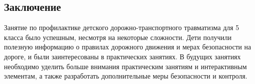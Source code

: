 \documentclass[a4paper,12pt]{article}
\begin{document}
\subsection*{Заключение}

Занятие по профилактике детского дорожно-транспортного травматизма для 5 класса было успешным, несмотря на некоторые сложности. Дети получили полезную информацию о правилах дорожного движения и мерах безопасности на дороге, и были заинтересованы в практических занятиях. В будущих занятиях необходимо уделить больше внимания практическим занятиям и интерактивным элементам, а также разработать дополнительные меры безопасности и контроля.
\end{document}

